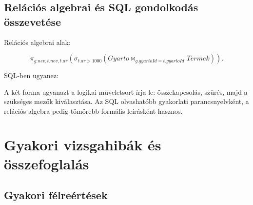 \subsection{Relációs algebrai és SQL gondolkodás összevetése}

Relációs algebrai alak:

\[
  \pi_{g.nev,t.nev,t.ar}(\sigma_{t.ar>1000}(Gyarto \bowtie_{g.gyartoId=t.gyartoId} Termek)).
\]

SQL-ben ugyanez:

\begin{center}
\end{center}

A két forma ugyanazt a logikai műveletsort írja le: összekapcsolás, szűrés, majd a szükséges mezők kiválasztása. Az SQL olvashatóbb gyakorlati parancsnyelvként, a relációs algebra pedig tömörebb formális leírásként hasznos.

\section{Gyakori vizsgahibák és összefoglalás}

\subsection{Gyakori félreértések}

